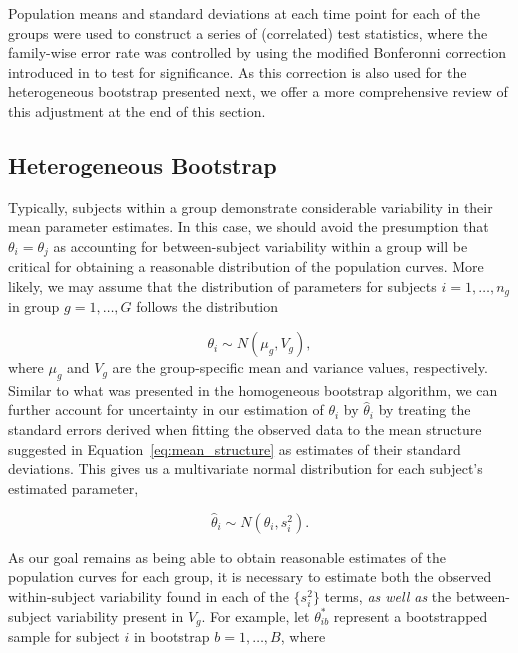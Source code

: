 \documentclass{article}
\begin{document}
Population means and standard deviations at each time point for each of the groups were used to construct a series of (correlated) test statistics, where the family-wise error rate was controlled by using the modified Bonferonni correction introduced in \citet{oleson2017detecting} to test for significance. As this correction is also used for the heterogeneous bootstrap presented next, we offer a more comprehensive review of this adjustment at the end of this section. 



\subsection{Heterogeneous Bootstrap}

Typically, subjects within a group demonstrate considerable variability in their mean parameter estimates. In this case, we should avoid the presumption that $\theta_i = \theta_j$ as accounting for between-subject variability within a group will be critical for obtaining a reasonable distribution of the population curves. More likely, we may assume that the distribution of parameters for subjects $i = 1, \dots, n_g$ in group $g = 1, \dots, G$ follows the distribution

\begin{equation}\label{eq:theta_i_dist}
\theta_i \sim N(\mu_{g}, V_{g}),
\end{equation}
where $\mu_g$ and $V_g$ are the group-specific mean and variance values, respectively. Similar to what was presented in the homogeneous bootstrap algorithm, we can further account for uncertainty in our estimation of $\theta_i$ by $\hat{\theta}_i$ by treating the standard errors derived when fitting the observed data to the mean structure suggested in Equation~\ref{eq:mean_structure} as estimates of their standard deviations. This gives us a multivariate normal distribution for each subject's estimated parameter, 

\begin{equation}
\hat{\theta}_i \sim N(\theta_i, s_i^2).
\end{equation}

As our goal remains as being able to obtain reasonable estimates of the population curves for each group, it is necessary to estimate both the observed within-subject variability found in each of the $\{s_i^2\}$ terms, \textit{as well as} the between-subject variability present in $V_{g}$. For example, let $\theta^*_{ib}$ represent a bootstrapped sample for subject $i$ in bootstrap $b = 1, \dots, B$, where
\end{document}
